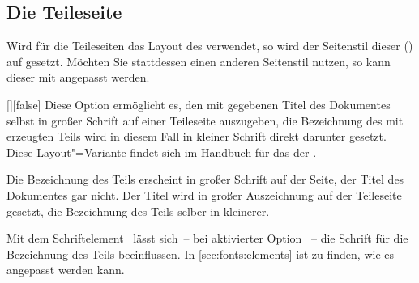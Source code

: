 \begin{Declaration*}{}
\begin{Declaration*}{}
\begin{Declaration*}{}
\subsection{Die Teileseite}
\label{sec:part}
%
Wird für die Teileseiten das Layout des \CDs verwendet, so wird der Seitenstil 
dieser () auf  gesetzt. 
Möchten Sie stattdessen einen anderen Seitenstil nutzen, so kann dieser mit 
angepasst werden.

\begin{Declaration}{[\PBoolean]}[false]%
\printdeclarationlist%
%
%
%
Diese Option ermöglicht es, den mit  gegebenen Titel des 
Dokumentes selbst in großer Schrift auf einer Teileseite auszugeben, die 
Bezeichnung des mit  erzeugten Teils wird 
in diesem Fall in kleiner Schrift direkt darunter gesetzt. Diese 
Layout"=Variante findet sich im Handbuch für das \CD der \TnUD. \notudscrartcl
%
\begin{values}
\itemfalse
  Die Bezeichnung des Teils erscheint in großer Schrift auf der Seite, der 
  Titel des Dokumentes gar nicht.
\itemtrue*
  Der Titel wird in großer Auszeichnung auf der Teileseite gesetzt, die 
  Bezeichnung des Teils selber in kleinerer.
\end{values}
\end{Declaration}

\begin{Declaration}[v2.02]{}
\printdeclarationlist%
%
%
Mit dem Schriftelement~ lässt sich~-- bei aktivierter Option
~-- die Schrift für die Bezeichnung des Teils beeinflussen. 
In \autoref{sec:fonts:elements} ist zu finden, wie es angepasst werden kann.
\end{Declaration}



\end{Declaration*}
\end{Declaration*}
\end{Declaration*}
